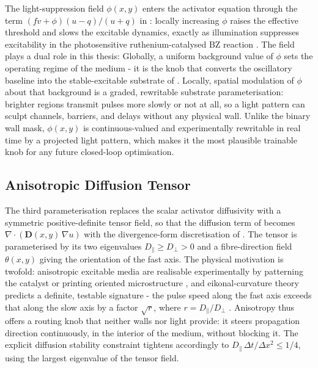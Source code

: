 The light-suppression field $\phi(x,y)$ enters the activator equation through the term $(f v + \phi)(u-q)/(u+q)$ in : locally increasing $\phi$ raises the effective threshold and slows the excitable dynamics, exactly as illumination suppresses excitability in the photosensitive ruthenium-catalysed BZ reaction \cite{sakurai2002design}. 
The field plays a dual role in this thesis: 
Globally, a uniform background value of $\phi$ sets the operating regime of the medium - it is the knob that converts the oscillatory baseline into the stable-excitable substrate of . 
Locally, spatial modulation of $\phi$ about that background is a graded, rewritable substrate parameterisation: brighter regions transmit pulses more slowly or not at all, so a light pattern can sculpt channels, barriers, and delays without any physical wall. 
Unlike the binary wall mask, $\phi(x,y)$ is continuous-valued and experimentally rewritable in real time by a projected light pattern, which makes it the most plausible trainable knob for any future closed-loop optimisation.

\subsection{Anisotropic Diffusion Tensor}
\label{sec:meth_anisotropy}

The third parameterisation replaces the scalar activator diffusivity with a symmetric positive-definite tensor field, so that the diffusion term of  becomes $\nabla\!\cdot\!(\mathbf{D}(x,y)\,\nabla u)$ with the divergence-form discretisation of . 
The tensor is parameterised by its two eigenvalues $D_{\parallel} \geq D_{\perp} > 0$ and a fibre-direction field $\theta(x,y)$ giving the orientation of the fast axis. 
The physical motivation is twofold: anisotropic excitable media are realisable experimentally by patterning the catalyst or printing oriented microstructure \cite{steinbock1995anisotropy}, and eikonal-curvature theory predicts a definite, testable signature - the pulse speed along the fast axis exceeds that along the slow axis by a factor $\sqrt{r}$, where $r = D_{\parallel}/D_{\perp}$ \cite{keener1991eikonal}. 
Anisotropy thus offers a routing knob that neither walls nor light provide: it steers propagation direction continuously, in the interior of the medium, without blocking it. 
The explicit diffusion stability constraint tightens accordingly to $D_{\parallel}\,\Delta t/\Delta x^{2} \leq 1/4$, using the largest eigenvalue of the tensor field.

